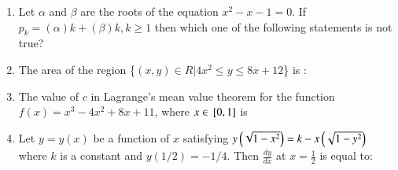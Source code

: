 \documentclass[journal]{IEEEtran}
\begin{document}
\begin{enumerate}


\item Let $\alpha$ and $\beta$ are the roots of the equation $x^2-x-1=0$. If $p_k = (\alpha)k + (\beta)k, k\geq1$ then which one of the following statements is not true?
 \begin{enumerate}
\end{enumerate}


\item The area of the region \{$(x, y)\in R | 4x^2 \leq y \leq 8x + 12$\} is :
\begin{enumerate}
\end{enumerate}

\item The value of $c$ in Lagrange's mean value theorem for the function $f(x) = x^3-4x^2+8x+11$, where $x \in {}\left[0,1\right]$ is
\begin{enumerate}
\end{enumerate}

\item  Let $y = y(x)$ be a function of $x$ satisfying $y\left(\sqrt{1-x^2}\right)=k-x\left(\sqrt{1-y^2}\right)$ where $k$ is a constant and $y(1/2) = -1/4$. Then $\frac{dy}{dx}$ at $x=\frac{1}{2}$ is equal to:
\begin{enumerate}
\end{enumerate}



\end{enumerate}
\end{document}
